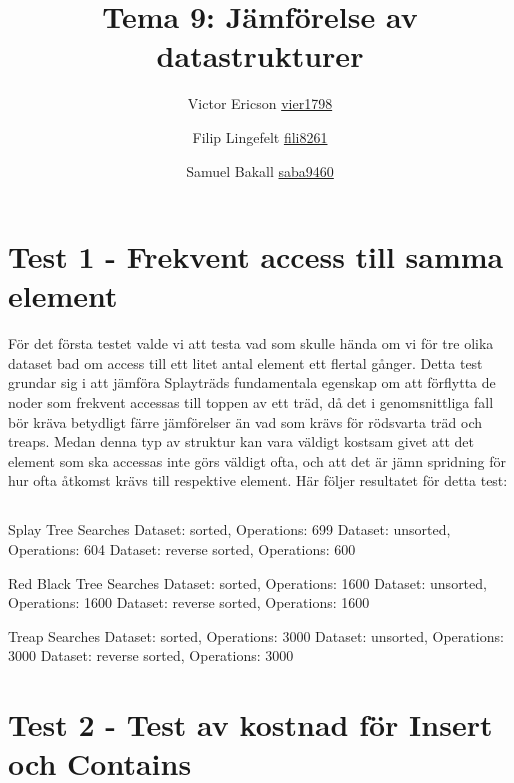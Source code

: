\documentclass[a4paper,10pt,oneside]{article}
\title{Tema 9: Jämförelse av datastrukturer}
\author{Victor Ericson \url{vier1798} \and Filip Lingefelt \url{fili8261} \and Samuel Bakall \url{saba9460}}
\begin{document}
    \maketitle
    \section{Test 1 - Frekvent access till samma element}
    För det första testet valde vi att testa vad som skulle hända om vi för tre olika dataset bad om access till ett litet antal element ett flertal gånger. Detta test grundar sig i att jämföra Splayträds fundamentala egenskap om att förflytta de noder som frekvent accessas till toppen av ett träd, då det i genomsnittliga fall bör kräva betydligt färre jämförelser än vad som krävs för rödsvarta träd och treaps. Medan denna typ av struktur kan vara väldigt kostsam givet att det element som ska accessas inte görs väldigt ofta, och att det är jämn spridning för hur ofta åtkomst krävs till respektive element. Här följer resultatet för detta test:
    \subsection{}
    Splay Tree Searches
    Dataset: sorted, Operations: 699
    Dataset: unsorted, Operations: 604
    Dataset: reverse sorted, Operations: 600

    Red Black Tree Searches
    Dataset: sorted, Operations: 1600
    Dataset: unsorted, Operations: 1600
    Dataset: reverse sorted, Operations: 1600

    Treap Searches
    Dataset: sorted, Operations: 3000
    Dataset: unsorted, Operations: 3000
    Dataset: reverse sorted, Operations: 3000
    \section{Test 2 - Test av kostnad för Insert och Contains}

\end{document}
